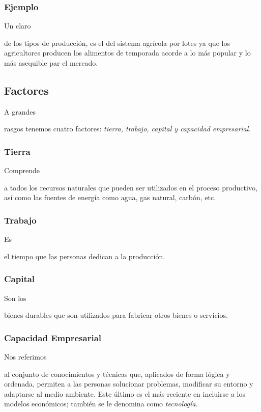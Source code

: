 \documentclass[stu, 12pt, letterpaper, donotrepeattitle, floatsintext, natbib]{apa7}
\begin{document}
\subsubsection{Ejemplo}
Un claro \begin{justifying}
    de los tipos de producción, es el del sistema agrícola por lotes ya que los agricultores producen los alimentos de temporada
    acorde a lo más popular y lo más asequible par el mercado.\par
\end{justifying}
\subsection{Factores}
A grandes \begin{justifying}
    rasgos tenemos cuatro factores: \emph{tierra, trabajo, capital y capacidad empresarial}. \citep{roldan-2021}\par %
\end{justifying}
\vspace{\baselineskip}
\subsubsection{Tierra}
Comprende \begin{justifying}
    a todos los recursos naturales que pueden ser utilizados en el proceso productivo, así como las fuentes de energía como agua,
    gas natural, carbón, etc.\par
\end{justifying}
\subsubsection{Trabajo}
Es \begin{justifying}
    el tiempo que las personas dedican a la producción.\par
\end{justifying}
\vspace{\baselineskip}
\subsubsection{Capital}
Son los\begin{justifying}
    bienes durables que son utilizados para fabricar otros bienes o servicios.\par
\end{justifying}
\vspace{\baselineskip}
\subsubsection{Capacidad Empresarial}
Nos referimos \begin{justifying}
    al conjunto de conocimientos y técnicas que, aplicados de forma lógica y ordenada, permiten a las personas solucionar problemas, modificar su entorno
    y adaptarse al medio ambiente. Este último es el más reciente en incluirse a los modelos económicos; también se le denomina
    como \emph{tecnología.}
\end{justifying}
\vspace{\baselineskip}
\end{document}
